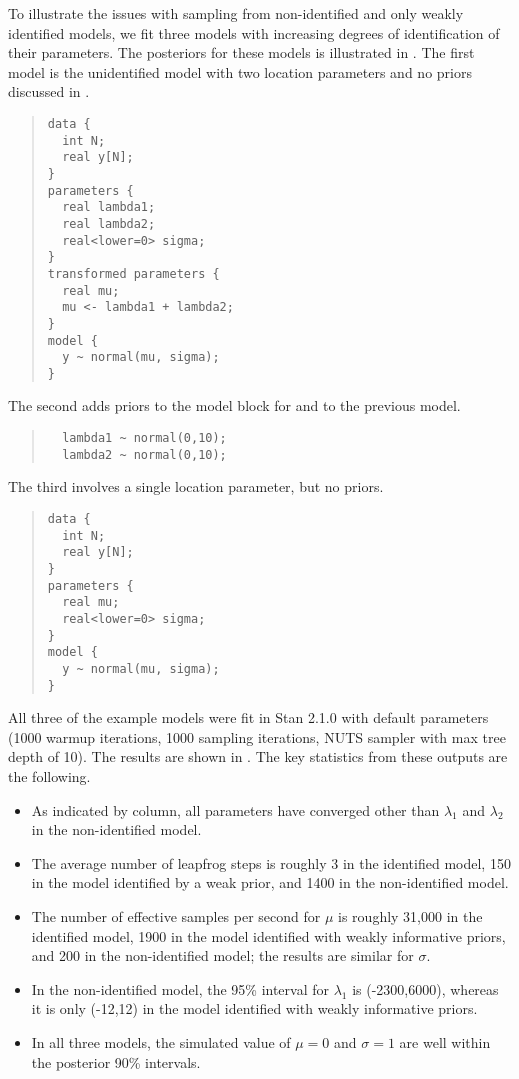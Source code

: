 To illustrate the issues with sampling from non-identified and only
weakly identified models, we fit three models with increasing degrees
of identification of their parameters.  The posteriors for these
models is illustrated in .  The
first model is the unidentified model with two location parameters and
no priors discussed in .
%
\begin{quote}
\begin{Verbatim}
data {
  int N;
  real y[N];
}
parameters {
  real lambda1;
  real lambda2;
  real<lower=0> sigma;
}
transformed parameters {
  real mu;
  mu <- lambda1 + lambda2;
}
model {
  y ~ normal(mu, sigma);
}
\end{Verbatim}
\end{quote}
%
The second adds priors to the model block for  and
 to the previous model.
%
\begin{quote}
\begin{Verbatim}
  lambda1 ~ normal(0,10);
  lambda2 ~ normal(0,10);
\end{Verbatim}
\end{quote}
%
The third involves a single location parameter, but no priors.
%
\begin{quote}
\begin{Verbatim}
data {
  int N;
  real y[N];
}
parameters {
  real mu;
  real<lower=0> sigma;
}
model {
  y ~ normal(mu, sigma);
}
\end{Verbatim}
\end{quote}
%
All three of the example models were fit in Stan 2.1.0 with default
parameters (1000 warmup iterations, 1000 sampling iterations, NUTS
sampler with max tree depth of 10). The results are shown in
. The key statistics from these
outputs are the following.
%
\begin{itemize}
\item As indicated by  column, all parameters have
  converged other than $\lambda_1$ and $\lambda_2$ in the
  non-identified model.
\item
  The average number of leapfrog steps is roughly 3 in
  the identified model, 150 in the model identified by a weak prior, and
  1400 in the non-identified model.
\item 
  The number of effective samples per
  second for $\mu$ is roughly 31,000 in the identified model, 1900 in the model
  identified with weakly informative priors, and 200 in the
  non-identified model; the results are similar for $\sigma$.  
\item 
  In the non-identified model, the 95\% interval for $\lambda_1$ is
  (-2300,6000), whereas it is only (-12,12) in the model identified with
  weakly informative priors.
\item
  In all three models, the simulated value of $\mu=0$ and $\sigma=1$
  are well within the posterior 90\% intervals.
\end{itemize}
